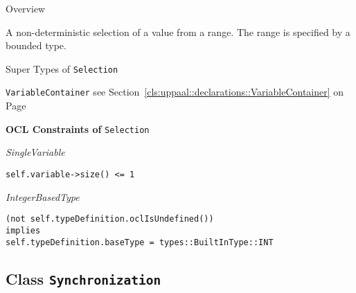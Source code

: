 	\begin{longdescription}
		\item[Overview] 		
				

	

		A non-deterministic selection of a value from a range. The range is specified by a bounded type.		
		\item[Super Types of \texttt{Selection}] ~
			\begin{longdescription}
				\item[\texttt{VariableContainer}] see Section~\ref{cls:uppaal::declarations::VariableContainer} on Page~\pageref{cls:uppaal::declarations::VariableContainer}						\end{longdescription}
		
	
			\item[\textbf{OCL Constraints of} \texttt{Selection}] ~
			\begin{longdescription}
	\item[\small\textit{SingleVariable}] ~ 
	\nopagebreak
	
		\begin{lstlisting}[breaklines=true]
self.variable->size() <= 1		\end{lstlisting}
	\item[\small\textit{IntegerBasedType}] ~ 
	\nopagebreak
	
		\begin{lstlisting}[breaklines=true]
(not self.typeDefinition.oclIsUndefined())
implies
self.typeDefinition.baseType = types::BuiltInType::INT		\end{lstlisting}
			\end{longdescription}
	
	\end{longdescription}
	

\subsection{Class \bfseries \texttt{Synchronization}\normalfont}
\label{cls:uppaal::templates::Synchronization} 
	
